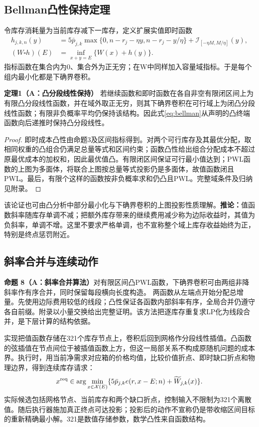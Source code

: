 \documentclass[UTF8,a4paper,zihao=-4,fontset=mac]{ctexart}
\newcommand{\I}{\mathcal I}
\newcommand{\pp}[2]{\par\noindent\textbf{命题 #1（#2）}\quad}
\begin{document}
\subsection{Bellman凸性保持定理}
令库存消耗量为当前库存减下一库存，定义扩展实值即时函数
\begin{equation}\label{eq:convolution}
\begin{aligned}
 h_{j,k,n}(y)&=5\bar p_{j,k}\max\{0,n-r_j-\eta y,n-r_j-y/\eta\}
             +\I_{[-\eta M,M/\eta]}(y),\\
 (W\square h)(E)&=\inf_{x+y=E}\{W(x)+h(y)\}.
\end{aligned}
\end{equation}
指标函数在集合内为0、集合外为正无穷；在W中同样加入容量域指标。于是每个组内最小化都是下确界卷积。

\noindent\textbf{定理1（A：凸分段线性保持）}\quad
若继续函数和即时函数在各自非空有限闭区间上为有限凸分段线性函数，并在域外取正无穷，则其下确界卷积在可行域上为闭凸分段线性函数；有限非负概率平均仍保持该结构。因此式\eqref{eq:bellman}从声明的凸终端函数向后递推时保持凸分段线性。
\begin{proof}
即时成本凸性由命题3及区间指标得到。对两个可行库存及其最优分配，取相同权重的凸组合仍满足总量等式和区间约束；函数凸性给出组合分配成本不超过原最优成本的加权和，因此最优值凸。有限闭区间保证可行最小值达到；PWL函数的上图为多面体，将联合上图按总量等式投影仍是多面体，故值函数闭且PWL。最后，有限个这样的函数按非负概率求和仍凸且PWL。完整域条件及归纳见附录。
\end{proof}
该论证也可由凸分析中部分最小化与下确界卷积的上图投影性质理解\cite{rockafellar,boyd}。\textbf{推论：}值函数斜率随库存单调不减；把额外库存带来的继续费用减少称为边际收益时，其值为负斜率，单调不增。这里不要求严格单调，也不宣称整个域上库存收益始终为正，特别是终点惩罚附近。

\subsection{斜率合并与连续动作}
\pp{8}{A：斜率合并算法}对有限区间凸PWL函数，下确界卷积可由两组非降斜率作有序合并，同时保留每段横向长度构造。
两函数从左端点开始分配总增量。先使用边际费用较低的线段；凸性保证各函数内部斜率有序，全局合并仍遵守各自前缀。附录以小量交换给出完整证明。该方法把逐库存重复求LP化为线段合并，是下层计算的结构依据。

实现把值函数存储在321个库存节点上，卷积后回到网格作分段线性插值。凸函数的弦插值在节点间位于被插值函数上方，但这一局部关系不构成原随机问题的成本界。执行时，用当前净需求对应箱的价格均值，比较价值折点、即时缺口折点和物理边界，得到连续库存请求：
\begin{equation}\label{eq:action}
 x^{\rm req}\in\arg\min_{x\in\mathcal X(E)}
 \{5\bar p_{j,k}e(r,x-E;n)+\widetilde W_{j,k}(x)\}.
\end{equation}
实际候选包括网格节点、当前库存和两个缺口折点，控制输入不限制为321个离散值。随后执行器施加真正终点可达投影；投影后的动作不宣称仍是带收缩区间目标的重新精确最小解。321是数值存储参数，数学凸性来自函数结构。
\end{document}
